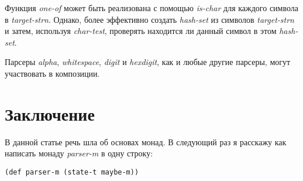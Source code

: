 \documentclass[a4paper,12pt]{article}
\newcommand{\cl}[1] {{\it #1}}
\begin{document}
Функция \cl{one-of} может быть реализована с помощью \cl{is-char} для каждого символа в \cl{target-strn}. 
Однако, более эффективно создать \cl{hash-set} из символов \cl{target-strn} и затем, используя 
\cl{char-test}, проверять находится ли данный символ в этом \cl{hash-set}. 

Парсеры \cl{alpha}, \cl{whitespace}, \cl{digit} и \cl{hexdigit}, как и любые другие парсеры, могут
участвовать в композиции. 

\section{Заключение}\label{coming-attraction}
В данной статье речь шла об основах монад. В следующий раз я расскажу как
написать монаду \cl{parser-m} в одну строку:

\begin{verbatim}
(def parser-m (state-t maybe-m))
\end{verbatim}
\end{document}
